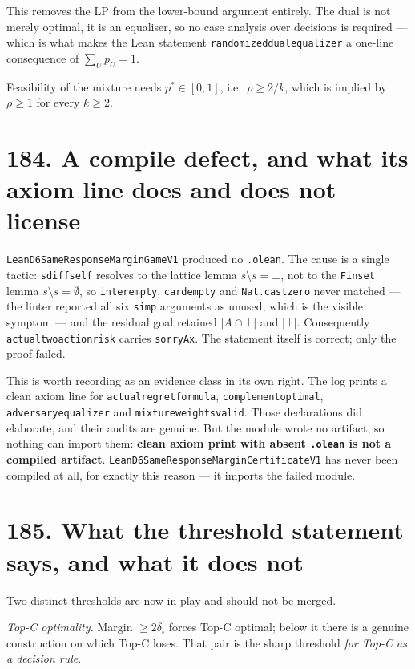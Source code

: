 \documentclass[9pt,twocolumn]{article}
\renewcommand{\_}{\CIGunderscore\allowbreak}
\begin{document}
This removes the LP from the lower-bound argument entirely. The dual is not merely optimal, it is an equaliser, so no case analysis over decisions is required --- which is what makes the Lean statement \texttt{randomized\_dual\_equalizer} a one-line consequence of $\sum_U p_U=1$.

Feasibility of the mixture needs $p^\ast\in[0,1]$, i.e.\ $\rho\ge 2/k$, which is implied by $\rho\ge1$ for every $k\ge2$.

\section*{184. A compile defect, and what its axiom line does and does not license}

\texttt{LeanD6SameResponseMarginGameV1} produced no \texttt{.olean}. The cause is a single tactic: \texttt{sdiff\_self} resolves to the lattice lemma $s\setminus s=\bot$, not to the \texttt{Finset} lemma $s\setminus s=\emptyset$, so \texttt{inter\_empty}, \texttt{card\_empty} and \texttt{Nat.cast\_zero} never matched --- the linter reported all six \texttt{simp} arguments as unused, which is the visible symptom --- and the residual goal retained $|A\cap\bot|$ and $|\bot|$. Consequently \texttt{actual\_two\_action\_risk} carries \texttt{sorryAx}. The statement itself is correct; only the proof failed.

This is worth recording as an evidence class in its own right. The log prints a clean axiom line for \texttt{actual\_regret\_formula}, \texttt{complement\_optimal}, \texttt{adversary\_equalizer} and \texttt{mixture\_weights\_valid}. Those declarations did elaborate, and their audits are genuine. But the module wrote no artifact, so nothing can import them: \textbf{clean axiom print with absent \texttt{.olean} is not a compiled artifact}. \texttt{LeanD6SameResponseMarginCertificateV1} has never been compiled at all, for exactly this reason --- it imports the failed module.

\section*{185. What the threshold statement says, and what it does not}

Two distinct thresholds are now in play and should not be merged.

\emph{Top-C optimality.} Margin $\ge2\delta_\square$ forces Top-C optimal; below it there is a genuine construction on which Top-C loses. That pair is the sharp threshold \emph{for Top-C as a decision rule}.
\end{document}
